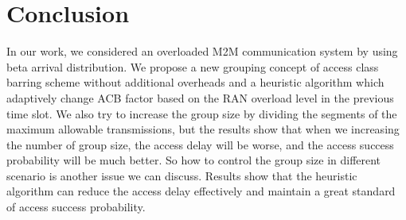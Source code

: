 \section{Conclusion}
\label{conclusion}
    In our work, we considered an overloaded M2M communication system by using beta arrival distribution. We propose a new grouping concept of access class barring scheme without additional overheads and a heuristic algorithm which adaptively change ACB factor based on the RAN overload level in the previous time slot. We also try to increase the group size by dividing the segments of the maximum allowable transmissions, but the results show that when we increasing the number of group size, the access delay will be worse, and the access success probability will be much better. So how to control the group size in different scenario is another issue we can discuss. Results show that the heuristic algorithm can reduce the access delay effectively and maintain a great standard of access success probability. 